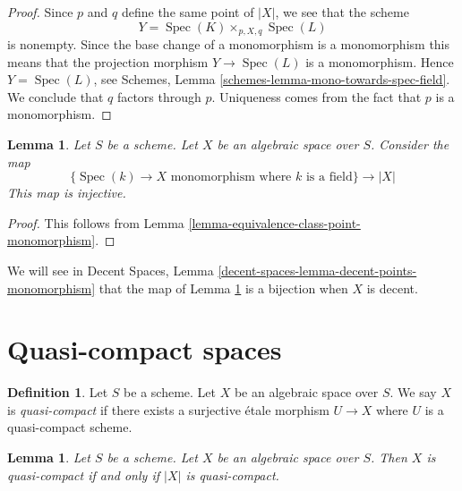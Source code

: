 \documentclass{stacks-project}
\theoremstyle{plain}
\newtheorem{lemma}[subsection]{Lemma}
\theoremstyle{definition}
\newtheorem{definition}[subsection]{Definition}
\theoremstyle{remark}
\numberwithin{equation}{subsection}
\def\Spec{\mathop{\mathrm{Spec}}}
\begin{document}
\begin{proof}
Since $p$ and $q$ define the same point of $|X|$, we see that the scheme
$$
Y = \Spec(K) \times_{p, X, q} \Spec(L)
$$
is nonempty. Since the base change of a monomorphism is a monomorphism
this means that the projection morphism $Y \to \Spec(L)$
is a monomorphism. Hence $Y = \Spec(L)$, see
Schemes, Lemma \ref{schemes-lemma-mono-towards-spec-field}.
We conclude that $q$ factors through $p$. Uniqueness
comes from the fact that $p$ is a monomorphism.
\end{proof}

\begin{lemma}
\label{lemma-points-monomorphism}
Let $S$ be a scheme. Let $X$ be an algebraic space over $S$.
Consider the map
$$
\{\Spec(k) \to X \text{ monomorphism where }k\text{ is a field}\}
\longrightarrow
|X|
$$
This map is injective.
\end{lemma}

\begin{proof}
This follows from Lemma \ref{lemma-equivalence-class-point-monomorphism}.
\end{proof}

\noindent
We will see in Decent Spaces,
Lemma \ref{decent-spaces-lemma-decent-points-monomorphism}
that the map of Lemma \ref{lemma-points-monomorphism}
is a bijection when $X$ is decent.

















\section{Quasi-compact spaces}
\label{section-quasi-compact}

\begin{definition}
\label{definition-quasi-compact}
Let $S$ be a scheme.
Let $X$ be an algebraic space over $S$.
We say $X$ is {\it quasi-compact} if there exists a surjective
\'etale morphism $U \to X$ where $U$ is a quasi-compact scheme.
\end{definition}

\begin{lemma}
\label{lemma-quasi-compact-space}
Let $S$ be a scheme.
Let $X$ be an algebraic space over $S$.
Then $X$ is quasi-compact if and only if $|X|$ is quasi-compact.
\end{lemma}
\end{document}
